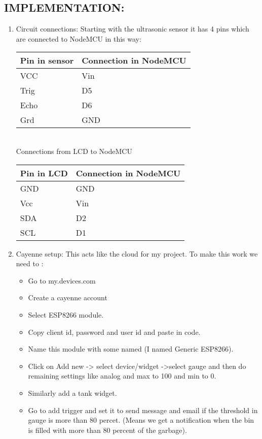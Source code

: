 \documentclass[12pt,letterpaper]{article}
\begin{document}
\subsection{IMPLEMENTATION:}
\begin{enumerate}
    \item Circuit connections: Starting with the ultrasonic sensor it has 4 pins which are connected to NodeMCU in this way:\\
    \begin{tabular}{ |p{3cm}|p{3cm}|  }
    \hline
    Pin in sensor & Connection in NodeMCU\\
    \hline
     VCC   & Vin\\
     Trig  & D5\\
     Echo  & D6\\
     Grd   & GND\\
     \hline
    \end{tabular}
    \vspace{0.1 in}\\
    Connections from LCD to NodeMCU\\ 
    \vspace{0.1 in}
    \begin{tabular}{ |p{3cm}|p{3cm}|  }
    \hline
    Pin in LCD & Connection in NodeMCU\\
    \hline
     GND   & GND\\
     Vcc   & Vin\\
     SDA   & D2\\
     SCL   & D1\\
     \hline
    \end{tabular}
    \item Cayenne setup: This acts like the cloud for my project. To make this work we need to :
    \begin{itemize}
        \item Go to my.devices.com
        \item Create a cayenne account
        \item Select ESP8266 module.
        \item Copy client id, password and user id and paste in code.
        \item Name this module with some named (I named Generic ESP8266).
        \item Click on Add new -> select device/widget ->select gauge and then do remaining settings like analog and max to 100 and min to 0.
        \item Similarly add a tank widget.
        \item Go to add trigger and set it to send message and email if the threshold in gauge is more than 80 percet. (Means we get a notification when the bin is filled with more than 80 percent of the garbage).

\end{itemize}
\end{enumerate}
\end{document}
